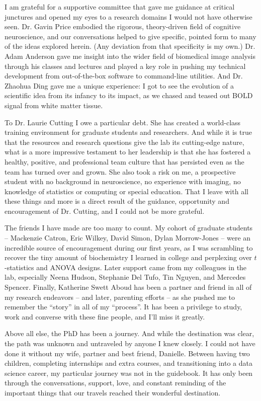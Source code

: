 \documentclass[12pt]{report}  %
\begin{document}
I am grateful for a supportive committee that gave me guidance at critical junctures and opened my eyes to a research domains I would not have otherwise seen. Dr. Gavin Price embodied the rigorous, theory-driven field of cognitive neuroscience, and our conversations helped to give specific, pointed form to many of the ideas explored herein. (Any deviation from that specificity is my own.) Dr. Adam Anderson gave me insight into the wider field of biomedical image analysis through his classes and lectures and played a key role in pushing my technical development from out-of-the-box software to command-line utilities. And Dr. Zhaohua Ding gave me a unique experience: I got to see the evolution of a scientific idea from its infancy to its impact, as we chased and teased out BOLD signal from white matter tissue.

To Dr. Laurie Cutting I owe a particular debt. She has created a world-class training environment for graduate students and researchers. And while it is true that the resources and research questions give the lab its cutting-edge nature, what is a more impressive testament to her leadership is that she has fostered a healthy, positive, and professional team culture that has persisted even as the team has turned over and grown. She also took a risk on me, a prospective student with no background in neuroscience, no experience with imaging, no knowledge of statistics or computing or special education. That I leave with all these things and more is a direct result of the guidance, opportunity and encouragement of Dr. Cutting, and I could not be more grateful.

The friends I have made are too many to count. My cohort of graduate students -- Mackenzie Catron, Eric Wilkey, David Simon, Dylan Morrow-Jones -- were an incredible source of encouragement during our first years, as I was scrambling to recover the tiny amount of biochemistry I learned in college and perplexing over $t$-statistics and ANOVA designs. Later support came from my colleagues in the lab, especially Neena Hudson, Stephanie Del Tufo, Tin Nguyen, and Mercedes Spencer. Finally, Katherine Swett Aboud has been a partner and friend in all of my research endeavors -- and later, parenting efforts -- as she pushed me to remember the ``story'' in all of my ``process''. It has been a privilege to study, work and converse with these fine people, and I'll miss it greatly. 

Above all else, the PhD has been a journey. And while the destination was clear, the path was unknown and untraveled by anyone I knew closely. I could not have done it without my wife, partner and best friend, Danielle. Between having two children, completing internships and extra courses, and transitioning into a data science career, my particular journey was not in the guidebook. It has only been through the conversations, support, love, and constant reminding of the important things that our travels reached their wonderful destination.
\end{document}
